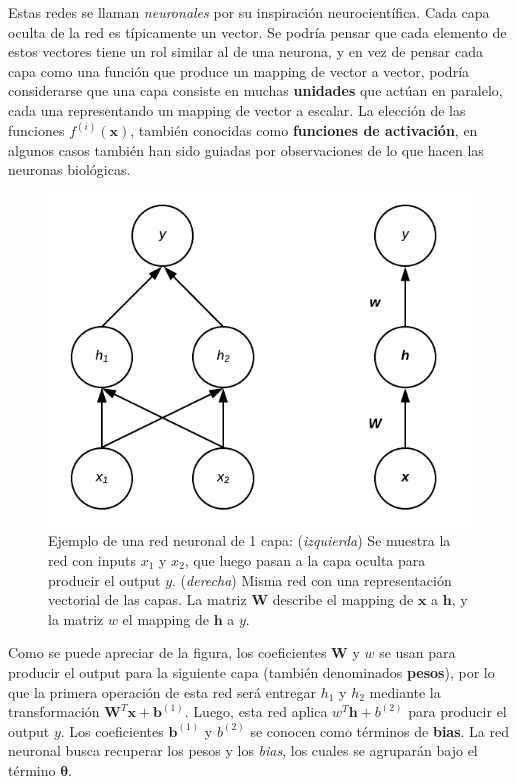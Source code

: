 Estas redes se llaman \textit{neuronales} por su inspiraci\'on neurocient\'ifica. Cada capa oculta de la red es t\'ipicamente un vector. Se podr\'ia pensar que cada elemento de estos vectores tiene un rol similar al de una neurona, y en vez de pensar cada capa como una funci\'on que produce un mapping de vector a vector, podr\'ia considerarse que una capa consiste en muchas \textbf{unidades} que act\'uan en paralelo, cada una representando un mapping de vector a escalar. La elecci\'on de las funciones $f^{(i)}(\bm{x})$, tambi\'en conocidas como \textbf{funciones de activaci\'on}, en algunos casos tambi\'en han sido guiadas por observaciones de lo que hacen las neuronas biol\'ogicas.

\begin{figure}[H]
\captionsetup{font=small,labelfont=small}
\caption{Ejemplo de una red neuronal de 1 capa: (\textit{izquierda}) Se muestra la red con inputs $x_1$ y $x_2$, que luego pasan a la capa oculta para producir el output $y$. (\textit{derecha}) Misma red con una representaci\'on vectorial de las capas. La matriz ${\bm{W}}$ describe el mapping de ${\bm{x}}$ a ${\bm{h}}$, y la matriz $w$ el mapping de ${\bm{h}}$ a $y$.}
\centering
\includegraphics[scale=.5]{img/F1NN1L.png}
\end{figure}

Como se puede apreciar de la figura, los coeficientes ${\bm{W}}$ y $w$ se usan para producir el output para la siguiente capa (tambi\'en denominados \textbf{pesos}), por lo que la primera operaci\'on de esta red ser\'a entregar $h_{1}$ y $h_{2}$ mediante la transformaci\'on ${\bm{W}^{T}}\bm{x} + \bm{b}^{(1)}$. Luego, esta red aplica $w^{T} \boldsymbol{h} + b^{(2)}$ para producir el output $y$. Los coeficientes $\bm{b}^{(1)}$ y  $b^{(2)}$ se conocen como t\'erminos de \textbf{bias}. La red neuronal busca recuperar los pesos y los \textit{bias}, los cuales se agrupar\'an bajo el t\'ermino $\bm{\theta}$.

